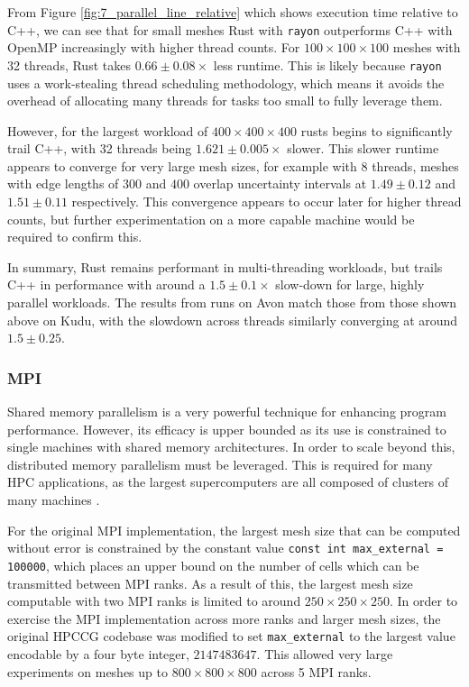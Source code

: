 From Figure \ref{fig:7_parallel_line_relative} which shows execution time relative to C++, we can see that for small meshes Rust with \texttt{rayon} outperforms C++ with OpenMP increasingly with higher thread counts. For $100 \times 100 \times 100$ meshes with 32 threads, Rust takes $0.66 \pm 0.08 \times$ less runtime. This is likely because \texttt{rayon} uses a work-stealing thread scheduling methodology, which means it avoids the overhead of allocating many threads for tasks too small to fully leverage them.

However, for the largest workload of $400 \times 400 \times 400$ rusts begins to significantly trail C++, with 32 threads being $1.621 \pm 0.005 \times$ slower. This slower runtime appears to converge for very large mesh sizes, for example with 8 threads, meshes with edge lengths of $300$ and $400$ overlap uncertainty intervals at $1.49 \pm 0.12$ and $1.51 \pm 0.11$ respectively. This convergence appears to occur later for higher thread counts, but further experimentation on a more capable machine would be required to confirm this.

In summary, Rust remains performant in multi-threading workloads, but trails C++ in performance with around a $1.5 \pm 0.1\times$ slow-down for large, highly parallel workloads. The results from runs on Avon match those from those shown above on Kudu, with the slowdown across threads similarly converging at around $1.5 \pm 0.25$.

\subsubsection{MPI}
\label{sssec:mpi}

Shared memory parallelism is a very powerful technique for enhancing program performance. However, its efficacy is upper bounded as its use is constrained to single machines with shared memory architectures. In order to scale beyond this, distributed memory parallelism must be leveraged. This is required for many \acrshort{HPC} applications, as the largest supercomputers are all composed of clusters of many machines \cite{HomeTOP500}.

For the original MPI implementation, the largest mesh size that can be computed without error is constrained by the constant value \texttt{const int max_external = 100000}, which places an upper bound on the number of cells which can be transmitted between MPI ranks. As a result of this, the largest mesh size computable with two MPI ranks is limited to around $250 \times 250 \times 250$. In order to exercise the MPI implementation across more ranks and larger mesh sizes, the original \acrshort{HPCCG} codebase was modified to set \texttt{max_external} to the largest value encodable by a four byte integer, $2147483647$. This allowed very large experiments on meshes up to $800 \times 800 \times 800$ across 5 MPI ranks.

